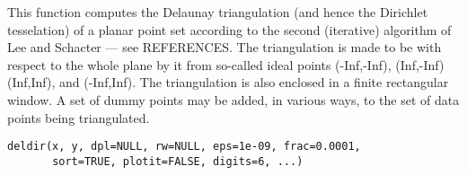 \begin{Description}\relax
This function computes the Delaunay triangulation (and hence the
Dirichlet tesselation) of a planar point set according to the second
(iterative) algorithm of Lee and Schacter --- see REFERENCES.  The
triangulation is made to be with respect to the whole plane by
 it from so-called ideal points (-Inf,-Inf), (Inf,-Inf)
(Inf,Inf), and (-Inf,Inf).  The triangulation is also enclosed in a
finite rectangular window.  A set of dummy points may
be added, in various ways, to the set of data points being triangulated.
\end{Description}
\begin{Usage}
\begin{verbatim}
deldir(x, y, dpl=NULL, rw=NULL, eps=1e-09, frac=0.0001,
       sort=TRUE, plotit=FALSE, digits=6, ...)
\end{verbatim}
\end{Usage}
